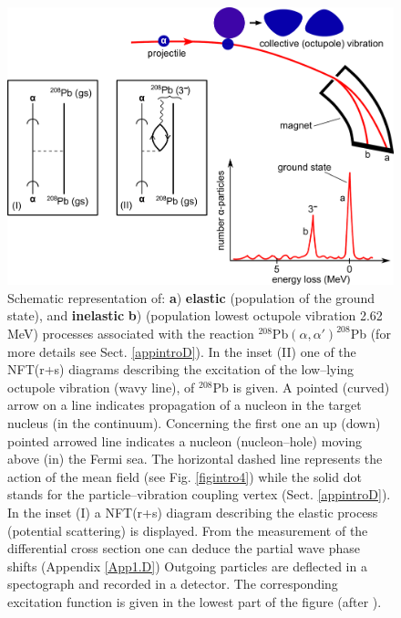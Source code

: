 \begin{figure}
\centerline {
\includegraphics*[width=15cm]{introduccion/figs/figintro1}
}
\caption{Schematic representation of: \textbf{a}) \textbf{elastic} (population of the ground state), and \textbf{inelastic} \textbf{b}) (population lowest octupole vibration 2.62 MeV) processes associated with the reaction $^{208}$Pb$(\alpha,\alpha')^{208}$Pb (for more details see Sect. \ref{appintroD}). In the inset (II) one of the NFT(r+s) diagrams describing the  excitation of the low--lying octupole vibration (wavy line), of $^{208}$Pb  is given. A pointed (curved) arrow on a line indicates propagation of a nucleon in the target nucleus (in the continuum). Concerning the first one an up (down) pointed arrowed line indicates a nucleon (nucleon--hole) moving above (in) the Fermi sea. The horizontal dashed line represents the action of the mean field (see Fig. \ref{figintro4}) while the solid dot stands for the particle--vibration coupling vertex (Sect. \ref{appintroD}). In the inset (I) a NFT(r+s) diagram describing  the elastic process (potential scattering) is displayed. From the measurement of the differential cross section one can deduce the partial wave phase shifts (Appendix \ref{App1.D}) Outgoing particles are deflected in a spectograph and recorded in a detector. The corresponding excitation function is given in the lowest part of the figure (after \cite{Mottelson:76b}).}
\label{figintro1}
\end{figure}
